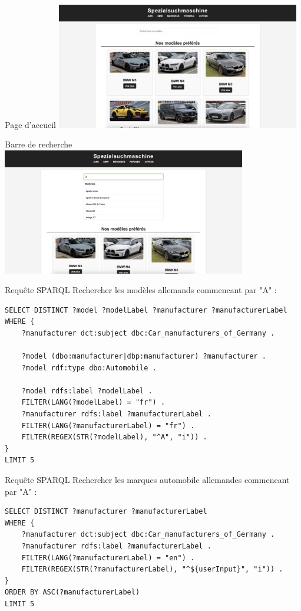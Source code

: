 \documentclass[10pt]{beamer}
\begin{document}
\begin{frame}{Page d'accueil}
\centering
\includegraphics[width=0.8\textwidth]{images/index.png}
\end{frame}

\begin{frame}{Barre de recherche}
\centering
\includegraphics[width=0.8\textwidth]{images/recherche.png}
\end{frame}

\begin{frame}[fragile]{Requête SPARQL}
Rechercher les modèles allemands commencant par "A" :
{\footnotesize
\begin{verbatim}
SELECT DISTINCT ?model ?modelLabel ?manufacturer ?manufacturerLabel
WHERE {
    ?manufacturer dct:subject dbc:Car_manufacturers_of_Germany .

    ?model (dbo:manufacturer|dbp:manufacturer) ?manufacturer .
    ?model rdf:type dbo:Automobile .

    ?model rdfs:label ?modelLabel .
    FILTER(LANG(?modelLabel) = "fr") .
    ?manufacturer rdfs:label ?manufacturerLabel .
    FILTER(LANG(?manufacturerLabel) = "fr") .
    FILTER(REGEX(STR(?modelLabel), "^A", "i")) .
}
LIMIT 5
\end{verbatim}
}
\end{frame}

\begin{frame}[fragile]{Requête SPARQL}
Rechercher les marques automobile allemandes commencant par "A" :  
{\footnotesize
\begin{verbatim}
SELECT DISTINCT ?manufacturer ?manufacturerLabel 
WHERE {
    ?manufacturer dct:subject dbc:Car_manufacturers_of_Germany .
    ?manufacturer rdfs:label ?manufacturerLabel .
    FILTER(LANG(?manufacturerLabel) = "en") .
    FILTER(REGEX(STR(?manufacturerLabel), "^${userInput}", "i")) .
}
ORDER BY ASC(?manufacturerLabel) 
LIMIT 5
\end{verbatim}
}
\end{frame}
\end{document}
